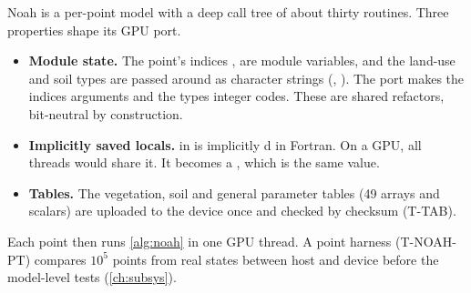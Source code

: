 \begin{portnote}
Noah is a per-point model with a deep call tree of about thirty routines. Three properties shape its GPU port.
\begin{itemize}
  \item \textbf{Module state.} The point's indices ,  are module variables, and the land-use
    and soil types are passed around as character strings (, ). The port makes the indices
    arguments and the types integer codes. These are shared refactors, bit-neutral by construction.
  \item \textbf{Implicitly saved locals.}  in  is implicitly d in
    Fortran. On a GPU, all threads would share it. It becomes a , which is the same value.
  \item \textbf{Tables.} The vegetation, soil and general parameter tables (49 arrays and scalars) are uploaded to the
    device once and checked by checksum (T-TAB).
\end{itemize}
Each point then runs \cref{alg:noah} in one GPU thread. A point harness (T-NOAH-PT) compares $10^5$ points from
real states between host and device before the model-level tests (\cref{ch:subsys}).
\end{portnote}

